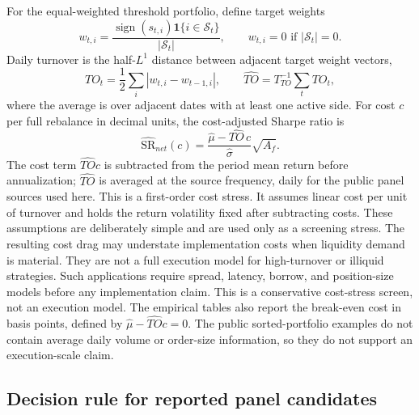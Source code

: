 \documentclass[12pt,a4paper]{article}
\newcommand{\SR}{\mathrm{SR}}
\DeclareMathOperator{\sign}{sign}
\begin{document}
For the equal-weighted threshold portfolio, define target weights
\begin{equation}
  w_{t,i} =
  \frac{\sign(s_{t,i})\mathbf 1\{i\in\mathcal S_t\}}
       {|\mathcal S_t|},
  \qquad w_{t,i}=0 \text{ if } |\mathcal S_t|=0 .
\end{equation}
Daily turnover is the half-\(L^1\) distance between adjacent target
weight vectors,
\begin{equation}
  TO_t = \frac{1}{2}\sum_i |w_{t,i}-w_{t-1,i}|,
  \qquad
  \widehat{TO}=T_{TO}^{-1}\sum_t TO_t ,
  \label{eq:turnover}
\end{equation}
where the average is over adjacent dates with at least one active side.
For cost \(c\) per full rebalance in decimal units, the cost-adjusted
Sharpe ratio is
\begin{equation}
  \widehat{\SR}_{net}(c)
  = \frac{\hat\mu-\widehat{TO}\,c}{\hat\sigma}\sqrt{A_f}.
  \label{eq:net-sr}
\end{equation}
The cost term \(\widehat{TO}c\) is subtracted from the period mean return
before annualization; \(\widehat{TO}\) is averaged at the source
frequency, daily for the public panel sources used here.
This is a first-order cost stress.  It assumes linear cost per unit of
turnover and holds the return volatility fixed after subtracting costs.
These assumptions are deliberately simple and are used only as a
screening stress.  The resulting cost drag may understate
implementation costs when liquidity demand is material.  They are not a
full execution model for high-turnover or illiquid strategies.  Such
applications require spread, latency, borrow, and position-size
models before any implementation claim.  This is a conservative
cost-stress screen, not an execution model.
The empirical tables also report the break-even cost in basis points,
defined by \(\hat\mu-\widehat{TO}c=0\).  The public sorted-portfolio
examples do not contain average daily volume or order-size information,
so they do not support an execution-scale claim.

\subsection{Decision rule for reported panel candidates}
\end{document}
